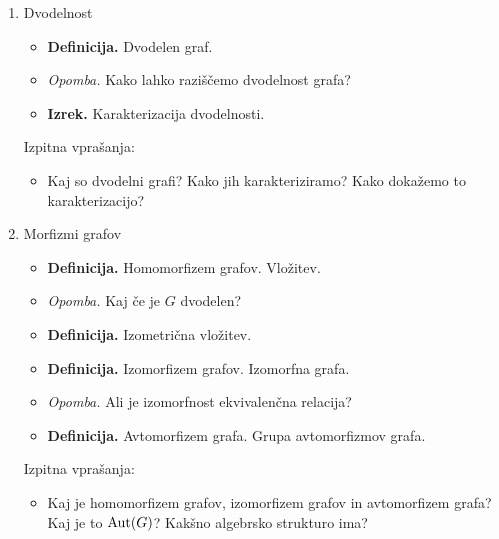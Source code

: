 \begin{enumerate}
    \item Dvodelnost
    \begin{itemize}
        \item \colorbox{purple!30}{\textbf{Definicija.}} Dvodelen graf.
        \item \colorbox{yellow!30}{\emph{Opomba.}} Kako lahko raziščemo dvodelnost grafa?
        \item \colorbox{blue!30}{\textbf{Izrek.}} Karakterizacija dvodelnosti.
    \end{itemize}

    Izpitna vprašanja:
    \begin{itemize}
        \item Kaj so dvodelni grafi? Kako jih karakteriziramo? Kako dokažemo to karakterizacijo?
    \end{itemize}  

    \newpage
    \item Morfizmi grafov
    \begin{itemize}
        \item \colorbox{purple!30}{\textbf{Definicija.}} Homomorfizem grafov. Vložitev.
        \item \colorbox{yellow!30}{\emph{Opomba.}} Kaj če je \(G\) dvodelen?
        \item \colorbox{purple!30}{\textbf{Definicija.}} Izometrična vložitev.
        \item \colorbox{purple!30}{\textbf{Definicija.}} Izomorfizem grafov. Izomorfna grafa.
        \item \colorbox{yellow!30}{\emph{Opomba.}} Ali je izomorfnost ekvivalenčna relacija?
        \item \colorbox{purple!30}{\textbf{Definicija.}} Avtomorfizem grafa. Grupa avtomorfizmov grafa.
    \end{itemize}

    Izpitna vprašanja:
    \begin{itemize}
        \item Kaj je homomorfizem grafov, izomorfizem grafov in avtomorfizem grafa? Kaj je to \(\operatorname{Aut}(G)\)? Kakšno algebrsko strukturo ima?
    \end{itemize}  


\end{enumerate}
